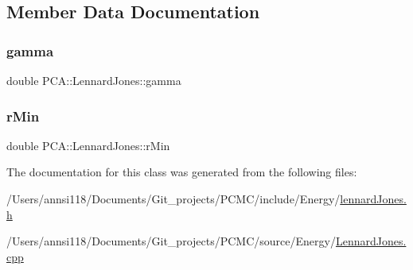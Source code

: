\subsection{Member Data Documentation}
\hypertarget{class_p_c_a_1_1_lennard_jones_ad28ea138038c2c43e9fd000752ea6130}{}\label{class_p_c_a_1_1_lennard_jones_ad28ea138038c2c43e9fd000752ea6130} 
\subsubsection{\texorpdfstring{gamma}{gamma}}
{\footnotesize\ttfamily double P\+C\+A\+::\+Lennard\+Jones\+::gamma\hspace{0.3cm}{\ttfamily [private]}}

\hypertarget{class_p_c_a_1_1_lennard_jones_aa59f5f2bb7cf5c83a33a7f95d23ef4c8}{}\label{class_p_c_a_1_1_lennard_jones_aa59f5f2bb7cf5c83a33a7f95d23ef4c8} 
\subsubsection{\texorpdfstring{r\+Min}{rMin}}
{\footnotesize\ttfamily double P\+C\+A\+::\+Lennard\+Jones\+::r\+Min\hspace{0.3cm}{\ttfamily [private]}}



The documentation for this class was generated from the following files\+:\begin{DoxyCompactItemize}
\item 
/\+Users/annsi118/\+Documents/\+Git\+\_\+projects/\+P\+C\+M\+C/include/\+Energy/\hyperlink{lennard_jones_8h}{lennard\+Jones.\+h}\item 
/\+Users/annsi118/\+Documents/\+Git\+\_\+projects/\+P\+C\+M\+C/source/\+Energy/\hyperlink{_lennard_jones_8cpp}{Lennard\+Jones.\+cpp}\end{DoxyCompactItemize}
